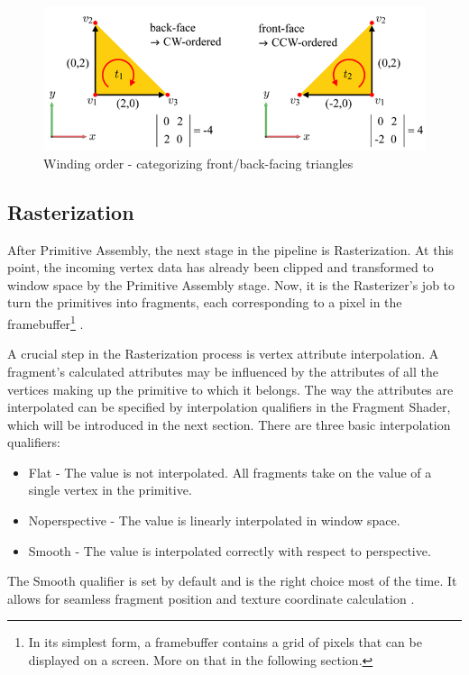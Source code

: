 \documentclass[
  digital,     %
  oneside,     %
  nosansbold,  %
  nocolorbold, %
  lof,         %
  lot,         %
]{fithesis4}
\begin{document}
\begin{figure}[H]
    \centering
    \includegraphics[height=0.32\linewidth]{images/tizen_front_back_face.png}
    \caption{Winding order - categorizing front/back-facing triangles \cite{tizen-face-culling}}
    \label{fig:tizen-front-back-face}
\end{figure}

\subsection{Rasterization}
After Primitive Assembly, the next stage in the pipeline is Rasterization. At this point, the incoming vertex data
has already been clipped and transformed to window space by the Primitive Assembly stage. Now, it is the Rasterizer's
job to turn the primitives into fragments, each corresponding to a pixel in the framebuffer\footnote{In its simplest
form, a framebuffer contains a grid of pixels that can be displayed on a screen. More on that in the following section.}
\cite[p.14]{opengl-book}.

A crucial step in the Rasterization process is vertex attribute interpolation. A fragment's calculated attributes
may be influenced by the attributes of all the vertices making up the primitive to which it belongs.
The way the attributes are interpolated can be specified by interpolation qualifiers in the Fragment Shader,
which will be introduced in the next section. There are three basic interpolation qualifiers:
\begin{itemize}
    \item Flat - The value is not interpolated. All fragments take on the value of a single vertex in the primitive.
    \item Noperspective - The value is linearly interpolated in window space.
    \item Smooth - The value is interpolated correctly with respect to perspective.
\end{itemize}
The Smooth qualifier is set by default and is the right choice most of the time. It allows for seamless
fragment position and texture coordinate calculation \cite{openglwiki-interpolation}.
\end{document}
